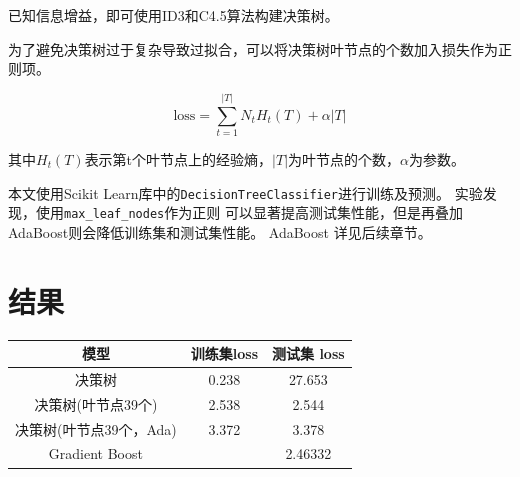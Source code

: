 \documentclass[a4paper, twocolumn]{article}
\begin{document}
已知信息增益，即可使用ID3和C4.5算法构建决策树\cite{statistics}。

为了避免决策树过于复杂导致过拟合，可以将决策树叶节点的个数加入损失作为正则项。

\begin{equation}
    \mathrm{loss} = \sum_{t=1}^{|T|}N_tH_t(T)+\alpha|T|
\end{equation}

其中$H_t(T)$表示第t个叶节点上的经验熵，$|T|$为叶节点的个数，$\alpha$为参数。

本文使用Scikit Learn库中的\lstinline[basicstyle=\ttfamily]|DecisionTreeClassifier|进行训练及预测\cite{scikit}。
实验发现，使用\lstinline[basicstyle=\ttfamily]|max_leaf_nodes|作为正则
可以显著提高测试集性能，但是再叠加AdaBoost则会降低训练集和测试集性能。
AdaBoost 详见后续章节。


\section{结果}

\begin{table}[h]
    \centering
    \begin{tabular}{ccc}
        \hline
        模型& 训练集loss& 测试集 loss \\
        \hline
        决策树& 0.238& 27.653 \\
        决策树(叶节点39个)& 2.538& 2.544 \\
        决策树(叶节点39个，Ada)& 3.372& 3.378 \\
        Gradient Boost& & 2.46332 \\
        \hline
    \end{tabular}
\end{table}

{}

\end{document}
